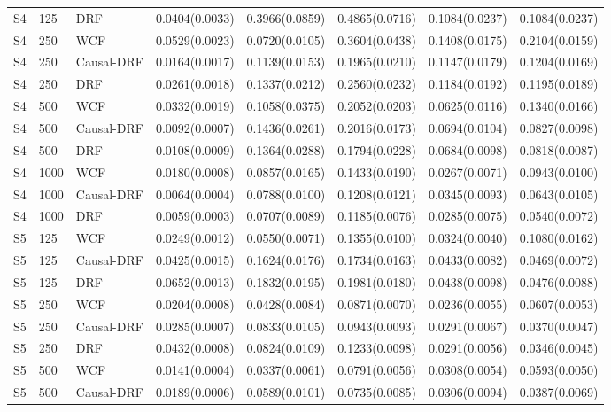 \begin{longtable}{lllrrrrr}
S4 & 125 & DRF & 0.0404(0.0033) & 0.3966(0.0859) & 0.4865(0.0716) & 0.1084(0.0237) & 0.1084(0.0237) \\
\addlinespace
S4 & 250 & WCF & 0.0529(0.0023) & 0.0720(0.0105) & 0.3604(0.0438) & 0.1408(0.0175) & 0.2104(0.0159) \\
S4 & 250 & Causal-DRF & 0.0164(0.0017) & 0.1139(0.0153) & 0.1965(0.0210) & 0.1147(0.0179) & 0.1204(0.0169) \\
S4 & 250 & DRF & 0.0261(0.0018) & 0.1337(0.0212) & 0.2560(0.0232) & 0.1184(0.0192) & 0.1195(0.0189) \\
\addlinespace
S4 & 500 & WCF & 0.0332(0.0019) & 0.1058(0.0375) & 0.2052(0.0203) & 0.0625(0.0116) & 0.1340(0.0166) \\
S4 & 500 & Causal-DRF & 0.0092(0.0007) & 0.1436(0.0261) & 0.2016(0.0173) & 0.0694(0.0104) & 0.0827(0.0098) \\
S4 & 500 & DRF & 0.0108(0.0009) & 0.1364(0.0288) & 0.1794(0.0228) & 0.0684(0.0098) & 0.0818(0.0087) \\
\addlinespace
S4 & 1000 & WCF & 0.0180(0.0008) & 0.0857(0.0165) & 0.1433(0.0190) & 0.0267(0.0071) & 0.0943(0.0100) \\
S4 & 1000 & Causal-DRF & 0.0064(0.0004) & 0.0788(0.0100) & 0.1208(0.0121) & 0.0345(0.0093) & 0.0643(0.0105) \\
S4 & 1000 & DRF & 0.0059(0.0003) & 0.0707(0.0089) & 0.1185(0.0076) & 0.0285(0.0075) & 0.0540(0.0072) \\
\addlinespace
\midrule
S5 & 125 & WCF & 0.0249(0.0012) & 0.0550(0.0071) & 0.1355(0.0100) & 0.0324(0.0040) & 0.1080(0.0162) \\
S5 & 125 & Causal-DRF & 0.0425(0.0015) & 0.1624(0.0176) & 0.1734(0.0163) & 0.0433(0.0082) & 0.0469(0.0072) \\
S5 & 125 & DRF & 0.0652(0.0013) & 0.1832(0.0195) & 0.1981(0.0180) & 0.0438(0.0098) & 0.0476(0.0088) \\
\addlinespace
S5 & 250 & WCF & 0.0204(0.0008) & 0.0428(0.0084) & 0.0871(0.0070) & 0.0236(0.0055) & 0.0607(0.0053) \\
S5 & 250 & Causal-DRF & 0.0285(0.0007) & 0.0833(0.0105) & 0.0943(0.0093) & 0.0291(0.0067) & 0.0370(0.0047) \\
S5 & 250 & DRF & 0.0432(0.0008) & 0.0824(0.0109) & 0.1233(0.0098) & 0.0291(0.0056) & 0.0346(0.0045) \\
\addlinespace
S5 & 500 & WCF & 0.0141(0.0004) & 0.0337(0.0061) & 0.0791(0.0056) & 0.0308(0.0054) & 0.0593(0.0050) \\
S5 & 500 & Causal-DRF & 0.0189(0.0006) & 0.0589(0.0101) & 0.0735(0.0085) & 0.0306(0.0094) & 0.0387(0.0069) \\

\end{longtable}
